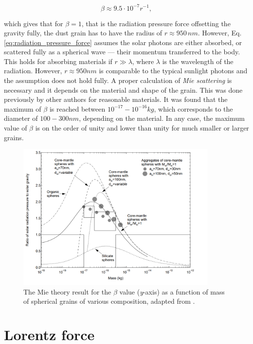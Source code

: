 \begin{equation}
    \beta \approx 9.5 \cdot 10^{-7} r^{-1},
\end{equation}

which gives that for $\beta = 1$, that is the radiation pressure force offsetting the gravity fully, the dust grain has to have the radius of $r \approx 950 \, \si{nm}$. However, Eq. \eqref{eq:radiation_pressure_force} assumes the solar photons are either absorbed, or scattered fully as a spherical wave --- their momentum transferred to the body. This holds for absorbing materials if $r \gg \lambda$, where $\lambda$ is the wavelength of the radiation. However, $r \approx 950 \si{nm}$ is comparable to the typical sunlight photons and the assumption does not hold fully. A proper calculation of \textit{Mie scattering} is necessary and it depends on the material and shape of the grain. This was done previously by other authors \cite{kimura2003composition} for reasonable materials. It was found that the maximum of $\beta$ is reached between $10^{-17} - 10^{-16} \si{kg}$, which corresponds to the diameter of $100 - 300 \si{nm}$, depending on the material. In any case, the maximum value of $\beta$ is on the order of unity and lower than unity for much smaller or larger grains.

\begin{figure}[h]
 	\centering
 	\includegraphics[width=10cm]{figures/kimurra_mie.png}
 	\caption{The Mie theory result for the $\beta$ value (\textit{y}-axis) as a function of mass of spherical grains of various composition, adapted from \cite{kimura2003composition}.}
 	\label{fig:kimura_mie}
\end{figure}

\section{Lorentz force}

